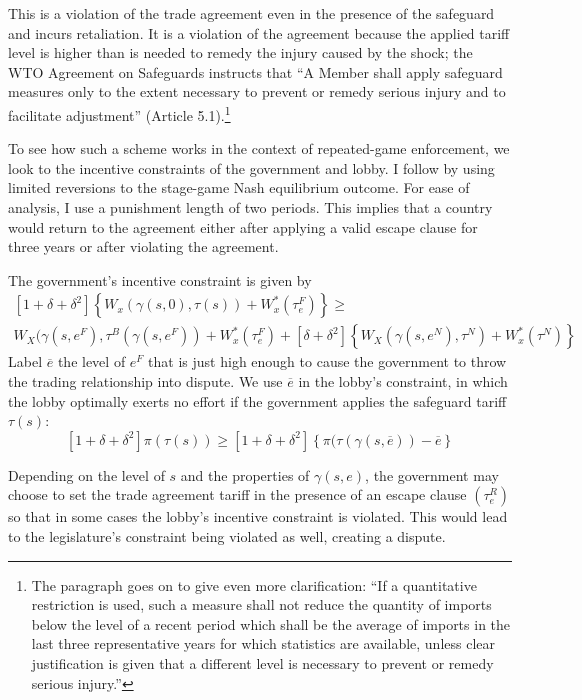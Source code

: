 \documentclass[12pt]{article}
\newcommand{\ov}{\overline}
\newcommand{\ga}{\gamma}
\newcommand{\de}{\delta}
\begin{document}
This is a violation of the trade agreement even in the presence of the safeguard and incurs retaliation. It is a violation of the agreement because the applied tariff level is higher than is needed to remedy the injury caused by the shock; the WTO Agreement on Safeguards instructs that ``A Member shall apply safeguard measures only to the extent necessary to prevent or remedy serious injury and to facilitate adjustment'' (Article 5.1).\footnote{The paragraph goes on to give even more clarification: ``If a quantitative restriction is used, such a measure shall  not reduce the quantity of imports below the level of a recent period which shall be the average of imports in the last three representative years for which statistics are available, unless clear justification is given that a different level is necessary to prevent or remedy serious injury.''}

To see how such a scheme works in the context of repeated-game enforcement, we look to the incentive constraints of the government and lobby. I follow \Textcite{buzard2013a} by using limited reversions to the stage-game Nash equilibrium outcome. For ease of analysis, I use a punishment length of two periods. This implies that a country would return to the agreement either after applying a valid escape clause for three years or after violating the agreement.

The government's incentive constraint is given by
  \begin{multline}
    \left[1+ \de +\de^2 \right] \left\{W_x(\ga(s,0),\tau(s)) + W_x^*(\tau_e^F) \right\} \geq \\ W_X(\ga(s,e^F),\tau^B(\ga(s,e^F)) + W_x^*(\tau_e^F) + \left[\de +\de^2 \right] \left\{W_X(\ga(s,e^N),\tau^N) + W_x^*(\tau^N) \right\}
		\label{exp:govincentEC}
  \end{multline}
Label $\ov{e}$ the level of $e^F$ that is just high enough to cause the government to throw the trading relationship into dispute. We use $\ov{e}$ in the lobby's constraint, in which the lobby optimally exerts no effort if the government applies the safeguard tariff $\tau(s)$:
\begin{equation}
  \left[1+ \de +\de^2 \right] \pi(\tau(s)) \geq \left[1+ \de +\de^2 \right] \left\{\pi(\tau(\ga(s,\ov{e})) - \ov{e} \right\}
	\label{exp:lobbyEC}
\end{equation}

Depending on the level of $s$ and the properties of $\ga(s,e)$, the government may choose to set the trade agreement tariff in the presence of an escape clause $\left(\tau_e^R\right)$ so that in some cases the lobby's incentive constraint is violated. This would lead to the legislature's constraint being violated as well, creating a dispute. 
\end{document}
